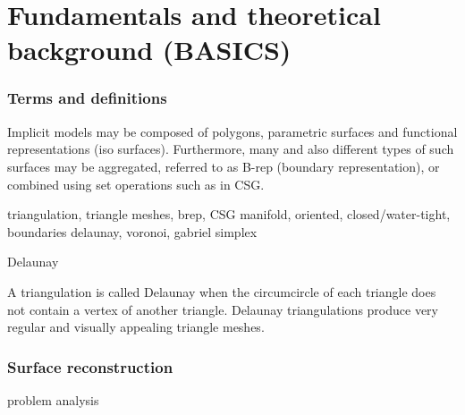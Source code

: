 \chapter{Fundamentals and theoretical background (BASICS)}

\subsection{Terms and definitions}


Implicit models may be composed of polygons, parametric surfaces and functional representations (iso surfaces).
Furthermore, many and also different types of such surfaces may be aggregated, referred to as B-rep (boundary representation), or combined using set operations such as in CSG.


triangulation,
triangle meshes,
brep, CSG
manifold, oriented, closed/water-tight, boundaries
delaunay, voronoi, gabriel simplex

Delaunay

A triangulation is called Delaunay when the circumcircle of each triangle does not contain a vertex of another triangle. Delaunay triangulations produce very regular and visually appealing triangle meshes.


\subsection{Surface reconstruction}
problem analysis



